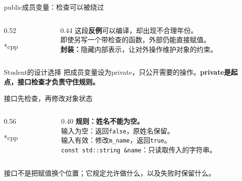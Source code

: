 \begin{frame}{public成员变量：检查可以被绕过}
    \begin{columns}[T]
        \begin{column}{0.52\textwidth}
            \begin{Code}*{cpp}
                
            \end{Code}
        \end{column}
        \begin{column}{0.44\textwidth}
            这段\textbf{反例}可以编译，却出现不合理年份。\\[8pt]
            即使另写一个带检查的函数，外部仍能直接赋值。\\[8pt]
            \textbf{封装：}隐藏内部表示，让对外操作维护对象的约束。
        \end{column}
    \end{columns}
    \medskip
    \begin{vspquotered}{Student的设计选择}
        把成员变量设为private，只公开需要的操作。\textbf{private是起点，接口检查才负责守住规则。}
    \end{vspquotered}
\end{frame}

\begin{frame}{接口先检查，再修改对象状态}
    \begin{columns}[T]
        \begin{column}{0.56\textwidth}
            \begin{Code}*{cpp}
                
            \end{Code}
        \end{column}
        \begin{column}{0.40\textwidth}
            \textbf{规则：姓名不能为空。}\\[8pt]
            输入为空：返回\texttt{false}，原姓名保留。\\[8pt]
            输入有效：修改\texttt{m\_name}，返回\texttt{true}。\\[8pt]
            \texttt{const std::string \&name}：只读取传入的字符串。
        \end{column}
    \end{columns}
    \medskip
    \alert{接口不是把赋值换个位置；它规定允许做什么，以及失败时保留什么。}
\end{frame}

